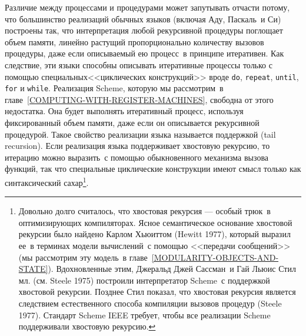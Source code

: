 Различие между процессами и
процедурами может запутывать отчасти потому, что большинство
реализаций обычных языков (включая Аду, Паскаль~и Си) построены
так,
что интерпретация любой рекурсивной процедуры
поглощает объем памяти,
линейно растущий пропорционально количеству вызовов процедуры, даже
если описываемый ею процесс~в принципе итеративен.  Как следствие,
эти языки способны описывать итеративные процессы только с
помощью специальных<<циклических конструкций>> вроде {\tt do},
{\tt repeat}, {\tt until}, {\tt for} и
{\tt while}.  Реализация Scheme, которую мы рассмотрим~в 
главе~\ref{COMPUTING-WITH-REGISTER-MACHINES}, свободна от этого
недостатка.  Она будет выполнять итеративный процесс, используя
фиксированный объем памяти, даже если он описывается рекурсивной
процедурой.  Такое свойство реализации языка называется поддержкой
 (tail recursion).
Если
реализация языка поддерживает хвостовую рекурсию, то 
итерацию можно выразить~с помощью обыкновенного
механизма вызова функций, так что 
специальные циклические конструкции имеют смысл только как
синтаксический сахар\footnote{Довольно долго
  считалось, что хвостовая рекурсия --- 
особый трюк~в оптимизирующих компиляторах.  Ясное семантическое
основание хвостовой рекурсии было найдено Карлом Хьюиттом (Hewitt
1977),
который выразил 
ее~в терминах модели вычислений~с помощью <<передачи сообщений>> (мы
рассмотрим эту модель~в главе~\ref{MODULARITY-OBJECTS-AND-STATE}).
Вдохновленные этим,  Джеральд Джей Сассман~и  Гай Льюис Стил
мл.
(см. Steele 1975) построили
интерпретатор Scheme~с поддержкой хвостовой рекурсии.  Позднее Стил
показал, что хвостовая рекурсия является следствием естественного
способа компиляции вызовов процедур (Steele 1977).
Стандарт Scheme IEEE требует, 
чтобы все реализации Scheme поддерживали хвостовую рекурсию.}.

